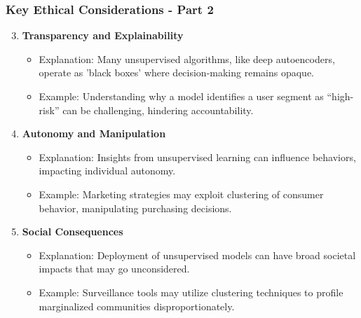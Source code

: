 \documentclass[aspectratio=169]{beamer}
\begin{document}
\begin{frame}[fragile]
    \frametitle{Key Ethical Considerations - Part 2}

    \begin{enumerate}
        \setcounter{enumi}{2}
        \item \textbf{Transparency and Explainability}
        \begin{itemize}
            \item Explanation: Many unsupervised algorithms, like deep autoencoders, operate as 'black boxes' where decision-making remains opaque.
            \item Example: Understanding why a model identifies a user segment as “high-risk” can be challenging, hindering accountability.
        \end{itemize}
        
        \item \textbf{Autonomy and Manipulation}
        \begin{itemize}
            \item Explanation: Insights from unsupervised learning can influence behaviors, impacting individual autonomy.
            \item Example: Marketing strategies may exploit clustering of consumer behavior, manipulating purchasing decisions.
        \end{itemize}

        \item \textbf{Social Consequences}
        \begin{itemize}
            \item Explanation: Deployment of unsupervised models can have broad societal impacts that may go unconsidered.
            \item Example: Surveillance tools may utilize clustering techniques to profile marginalized communities disproportionately.
        \end{itemize}
    \end{enumerate}

\end{frame}
\end{document}
